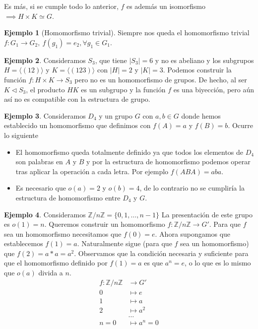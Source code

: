 \documentclass{book}
\theoremstyle{definition}
\newtheorem{ej}{Ejemplo}
\theoremstyle{remark}
\newcommand{\normsub}{\mathbin{\triangleleft}}
\newcommand{\isom}{\simeq}
\newcommand{\ZnZ}{\mathbb{Z}/n\mathbb{Z}}
\begin{document}
Es más, si se cumple todo lo anterior, $f$ es además un isomorfismo $\implies H\times K \isom G$.

\begin{ej}[Homomorfismo trivial]Siempre nos queda el homomorfismo trivial $f:G_1 \to G_2,\ f(g_1) = e_2, \forall g_1 \in G_1$.
\end{ej}

\begin{ej}
	\label{ej:nohomoentreproducto}
	Consideramos $S_3$, que tiene $|S_3| = 6$ y no es abeliano y los subgrupos $H = \langle (12) \rangle$ y $K = \langle (123) \rangle$ con $|H| = 2$ y $|K| = 3$. Podemos construir la función $f:H\times K \to S_3$ pero no es un homomorfismo de grupos. De hecho, al ser $K \normsub S_3$, el producto $HK$ es un subgrupo y la función $f$ es una biyección, pero aún así no es compatible con la estructura de grupo.
\end{ej}

\begin{ej}
	Consideramos $D_4$ y un grupo $G$ con $a,b \in G$ donde hemos establecido un homomorfismo que definimos con $f(A) = a$ y $f(B) = b$. Ocurre lo siguiente
	\begin{itemize}
		\item El homomorfismo queda totalmente definido ya que todos los elementos de $D_4$ son palabras en $A$ y $B$ y por la estructura de homomorfismo podemos operar tras aplicar la operación a cada letra. Por ejemplo $f(ABA) = aba$.
		\item Es necesario que $o(a) = 2$ y $o(b) = 4$, de lo contrario no se cumpliría la estructura de homomorfismo entre $D_4$ y $G$.
	\end{itemize}
\end{ej}

\begin{ej}
	Consideramos $\ZnZ = \{0, 1, \dots, n-1\}$ La presentación de este grupo es $o(1) = n$. Queremos construir un homomorfismo $f:\ZnZ \to G'$. Para que $f$ sea un homomorfismo necesitamos que $f(0) = e$. Ahora supongamos que establecemos $f(1) = a$. Naturalmente sigue (para que $f$ sea un homomorfismo) que $f(2) = a\ast a = a^2$. Observamos que la condición necesaria y suficiente para que el homomorfismo definido por $f(1) = a$ es que $a^n = e$, o lo que es lo mismo que $o(a)$ divida a $n$.
	\begin{align*}
		f:\ZnZ &\to G' \\
		0 &\mapsto e \\
		1 &\mapsto a \\
		2 &\mapsto a^2\\
		&\dots \\
		n = 0 &\mapsto a^n = 0
	\end{align*}
\end{ej}
\end{document}
